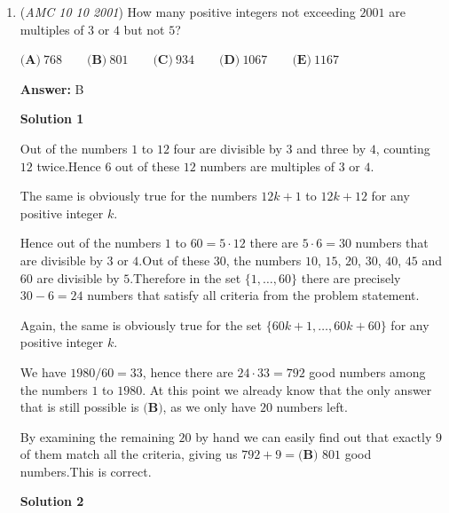 \begin{enumerate}
\textbf{Solution 5 (Quick Solve)}

Denote $AB$ to $x$, and $CD$ to $y$. This means that $BC = x+y$. This means that if we draw an altitude from $B$ $CD$ and we call the foot of that $P$, we have that $BP$ is $7$ due to symmetry. This means 
 \[7^2+(y-x)^2 = (x+y)^2\]. Simplifying gets you: 
 \[49 +y ^2-2xy+x^2 = x^2+2xy+y^2 \Longrightarrow xy = \dfrac{49}{4} \Longrightarrow xy = \boxed{\textbf{(B)}\ 12.25}\].

 -jb2015007

 


	\item (\textit{AMC 10 10 2001}) How many positive integers not exceeding $2001$ are multiples of $3$ or $4$ but not $5$?


 $\textbf{(A)}\ 768 \qquad \textbf{(B)}\ 801 \qquad \textbf{(C)}\ 934 \qquad \textbf{(D)}\ 1067 \qquad \textbf{(E)}\ 1167$

 \textbf{Answer: }B



\textbf{Solution 1}

Out of the numbers $1$ to $12$ four are divisible by $3$ and three by $4$, counting $12$ twice.Hence $6$ out of these $12$ numbers are multiples of $3$ or $4$. 

 The same is obviously true for the numbers $12k+1$ to $12k+12$ for any positive integer $k$.

 Hence out of the numbers $1$ to $60=5\cdot 12$ there are $5\cdot 6=30$ numbers that are divisible by $3$ or $4$.Out of these $30$, the numbers $10$, $15$, $20$, $30$, $40$, $45$ and $60$ are divisible by $5$.Therefore in the set $\{1,\dots,60\}$ there are precisely $30-6=24$ numbers that satisfy all criteria from the problem statement.

 Again, the same is obviously true for the set $\{60k+1,\dots,60k+60\}$ for any positive integer $k$.

 We have $1980/60 = 33$, hence there are $24\cdot 33 = 792$ good numbers among the numbers $1$ to $1980$. At this point we already know that the only answer that is still possible is $\boxed{\textbf{(B)}}$, as we only have $20$ numbers left.

 By examining the remaining $20$ by hand we can easily find out that exactly $9$ of them match all the criteria, giving us $792+9=\boxed{\textbf{(B) }801}$ good numbers.This is correct.

 



\textbf{Solution 2}


\end{enumerate}
